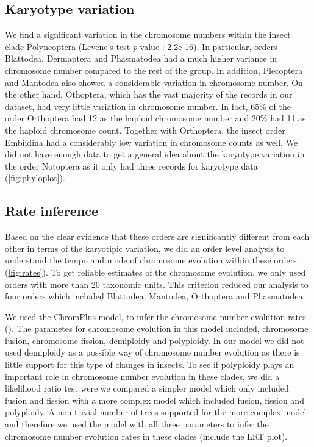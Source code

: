

\subsection{Karyotype variation}
We find a significant variation in the chromosome numbers within the insect clade Polyneoptera (Levene's test \textit{p}-value : 2.2e-16).
In particular, orders Blattodea, Dermaptera and Phasmatodea had a much higher variance in chromosome number compared to the rest of the group.
In addition, Plecoptera and Mantodea also showed a considerable variation in chromosome number. 
On the other hand, Othoptera, which has the vast majority of the records in our dataset, had very little variation in chromosome number. 
In fact, 65\% of the order Orthoptera had 12 as the haploid chromosome number and 20\% had 11 as the haploid chromosome count. 
Together with Orthoptera, the insect order Embiidina had a considerably low variation in chromosome counts as well. 
We did not have enough data to get a general idea about the karyotype variation in the order Notoptera as it only had three records for karyotype data (\cref{fig:phyloplot}).

\subsection{Rate inference}
Based on the clear evidence that these orders are significantly different from each other in terms of the karyotipic variation, we did an order level analysis to understand the tempo and mode of chromosome evolution within these orders (\cref{fig:rates}). 
To get reliable estimates of the chromosome evolution, we only used orders with more than 20 taxonomic units.
This criterion reduced our analysis to four orders which included Blattodea, Mantodea, Orthoptera and Phasmatodea.

We used the ChromPlus model, to infer the chromosome number evolution rates (\citep{blackmon2019meiotic}).
The parametes for chromosome evolution in this model included, chromosome fusion, chromosome fission, demiploidy and polyploidy.
In our model we did not used demiploidy as a possible way of chromosome number evolution as there is little support for this type of changes in insects.
To see if polyploidy plays an important role in chromosome number evolution in these clades, we did a likelihood ratio test were we compared a simpler model which only included fusion and fission with a more complex model which included fusion, fission and polyploidy.
A non trivial number of trees supported for the more complex model and therefore we used the model with all three parameters to infer the chromosome number evolution rates in these clades (include the LRT plot).

